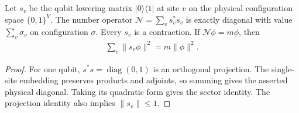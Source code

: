 \begin{lemma}
    \label{thm:hastings05_hard_core_number}
    \leanok
    Let $s_v$ be the qubit lowering matrix $|0\rangle\langle1|$ at site
    $v$ on the physical configuration space $\{0,1\}^V$.
    The number operator $\mathcal N=\sum_vs_v^*s_v$ is exactly diagonal
    with value $\sum_v\sigma_v$ on configuration $\sigma$.
    Every $s_v$ is a contraction. If $\mathcal N\phi=m\phi$, then
    \begin{align*}
        \sum_v\|s_v\phi\|^2=m\|\phi\|^2.
    \end{align*}
\end{lemma}
\begin{proof}\leanok
    For one qubit, $s^*s=\operatorname{diag}(0,1)$ is an orthogonal
    projection. The single-site embedding preserves products and adjoints,
    so summing gives the asserted physical diagonal. Taking its quadratic
    form gives the sector identity. The projection identity also implies
    $\|s_v\|\le1$.
\end{proof}


